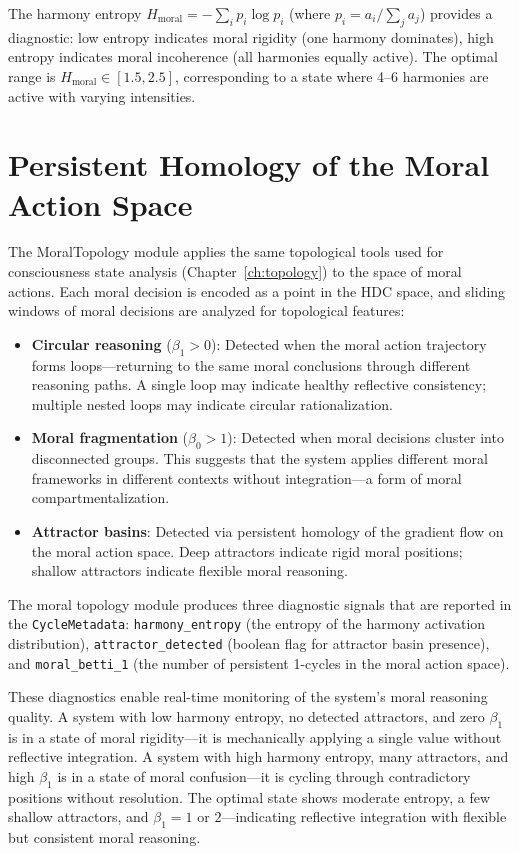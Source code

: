 \documentclass[12pt]{book}
\begin{document}
The harmony entropy $H_{\text{moral}} = -\sum_i p_i \log p_i$ (where $p_i = a_i / \sum_j a_j$) provides a diagnostic: low entropy indicates moral rigidity (one harmony dominates), high entropy indicates moral incoherence (all harmonies equally active). The optimal range is $H_{\text{moral}} \in [1.5, 2.5]$, corresponding to a state where 4--6 harmonies are active with varying intensities.

\section{Persistent Homology of the Moral Action Space}

The MoralTopology module applies the same topological tools used for consciousness state analysis (Chapter~\ref{ch:topology}) to the space of moral actions. Each moral decision is encoded as a point in the HDC space, and sliding windows of moral decisions are analyzed for topological features:

\begin{itemize}
  \item \textbf{Circular reasoning} ($\beta_1 > 0$): Detected when the moral action trajectory forms loops---returning to the same moral conclusions through different reasoning paths. A single loop may indicate healthy reflective consistency; multiple nested loops may indicate circular rationalization.
  \item \textbf{Moral fragmentation} ($\beta_0 > 1$): Detected when moral decisions cluster into disconnected groups. This suggests that the system applies different moral frameworks in different contexts without integration---a form of moral compartmentalization.
  \item \textbf{Attractor basins}: Detected via persistent homology of the gradient flow on the moral action space. Deep attractors indicate rigid moral positions; shallow attractors indicate flexible moral reasoning.
\end{itemize}

The moral topology module produces three diagnostic signals that are reported in the \texttt{CycleMetadata}: \texttt{harmony\_entropy} (the entropy of the harmony activation distribution), \texttt{attractor\_detected} (boolean flag for attractor basin presence), and \texttt{moral\_betti\_1} (the number of persistent 1-cycles in the moral action space).

These diagnostics enable real-time monitoring of the system's moral reasoning quality. A system with low harmony entropy, no detected attractors, and zero $\beta_1$ is in a state of moral rigidity---it is mechanically applying a single value without reflective integration. A system with high harmony entropy, many attractors, and high $\beta_1$ is in a state of moral confusion---it is cycling through contradictory positions without resolution. The optimal state shows moderate entropy, a few shallow attractors, and $\beta_1 = 1$ or $2$---indicating reflective integration with flexible but consistent moral reasoning.
\end{document}
